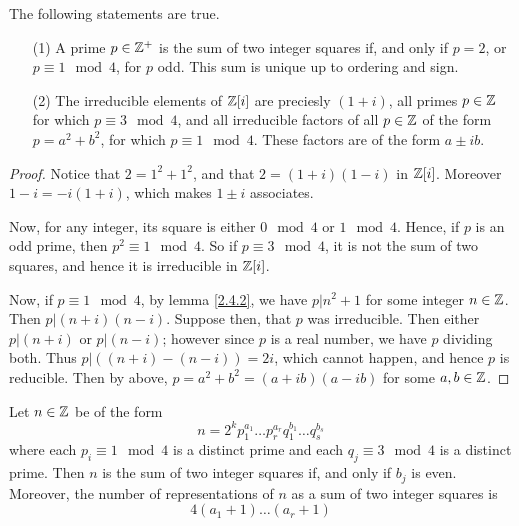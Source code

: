 \begin{theorem}\label{2.4.4}
    The following statements are true.
    \begin{enumerate}
        \item[(1)] A prime $p \in \mathbb{Z}^+$ is the sum of two integer squares if,
            and only if  $p=2$, or  $p \equiv 1 \mod{4}$, for $p$ odd. This sum
            is unique up to ordering and sign.

        \item[(2)] The irreducible elements of $\mathbb{Z}[i]$ are preciesly $(1+i)$,
            all primes $p \in \mathbb{Z}$ for which  $p \equiv 3 \mod{4}$, and all
            irreducible factors of all $p \in \mathbb{Z}$ of the form $p=a^2+b^2$, for
            which  $p \equiv 1 \mod{4}$. These factors are of the form $a \pm
            ib$.
    \end{enumerate}
\end{theorem}
\begin{proof}
    Notice that $2=1^2+1^2$, and that  $2=(1+i)(1-i)$ in $\mathbb{Z}[i]$. Moreover
    $1-i=-i(1+i)$, which makes $1 \pm i$ associates.

    Now, for any integer, its square is either $0 \mod{4}$ or $1 \mod{4}$.
    Hence, if $p$ is an odd prime, then $p^2 \equiv 1 \mod{4}$. So if $p \equiv
    3 \mod{4}$, it is not the sum of two squares, and hence it is irreducible in
    $\mathbb{Z}[i]$.

    Now, if $p \equiv 1 \mod{4}$, by lemma \ref{2.4.2}, we have $p|n^2+1$ for
    some integer  $n \in \mathbb{Z}$. Then  $p|(n+i)(n-i)$. Suppose then, that $p$ was
    irreducible. Then either $p|(n+i)$ or $p|(n-i)$; however since $p$ is a real
    number, we have $p$ dividing both. Thus $p|((n+i)-(n-i))=2i$, which cannot
    happen, and hence $p$ is reducible. Then by above, $p=a^2+b^2=(a+ib)(a-ib)$
    for some $a,b \in \mathbb{Z}$.
\end{proof}
\begin{corollary}
    Let $n \in \mathbb{Z}$ be of the form
    \begin{equation*}
        n=2^kp_1^{a_1} \dots p_r^{a_r}q_1^{b_1} \dots q_s^{b_s}
    \end{equation*}
    where each $p_i \equiv 1 \mod{4}$ is a distinct prime and each $q_j \equiv 3
    \mod{4}$ is a distinct prime. Then $n$ is the sum of two integer squares if,
    and only if $b_j$ is even. Moreover, the number of representations of $n$ as
    a sum of two integer squares is
    \begin{equation*}
        4(a_1+1) \dots (a_r+1)
    \end{equation*}
\end{corollary}

